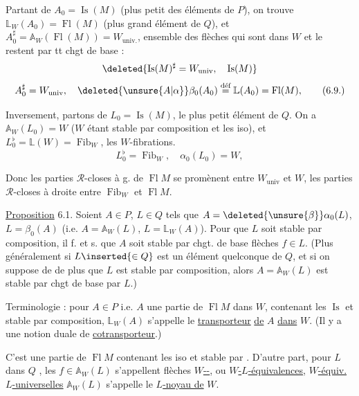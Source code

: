 Partant de $A_0=\operatorname{Is}(M)$ (plus petit des éléments
de $P$), on trouve $\mathbb L_W(A_0)=\operatorname{Fl}(M)$ (plus grand
élément de $Q$), et $A_0^\sharp=\mathbb A_W(\operatorname{Fl}(M))=W_{\mathrm{univ.}}$,
ensemble des flèches qui sont dans $W$ et le
restent par tt chgt de base :
\[
\deleted{\operatorname{Is}(M)^\sharp=W_{\mathrm{univ}},\quad\operatorname{Is}(M)}
\]
\[
A_0^\sharp=W_{\mathrm{univ}},\quad
\deleted{\unsure{A|\alpha}}\beta_0(A_0)\overset{\text{déf}}{=}\mathbb L(A_0)=\operatorname{Fl}(M),
\tag*{(6.9.)}
\]

Inversement, partons de $L_0=\operatorname{Is}(M)$, le plus petit
élément de $Q$. On a $\mathbb A_W(L_0)=W$ ($W$
étant stable par composition et  les iso),
et $L_0^\flat=\mathbb L(W)=\operatorname{Fib}_W$, les $W$-fibrations.
\[
L_0^\flat=\operatorname{Fib}_W,\quad \alpha_0(L_0)=W,
\tag*{(6.10)}
\]

Donc les parties $\mathcal R$-closes à g. de $\operatorname{Fl} M$
se promènent entre $W_{\mathrm{univ}}$ et $W$, les
parties $\mathcal R$-closes à droite entre $\operatorname{Fib}_W$ et $\operatorname{Fl} M$.

\uline{Proposition} 6.1. Soient $A\in P$, $L\in Q$ tels
\llap{\smash{\rule[-4.9\baselineskip]{0.35pt}{5.2\baselineskip}}\hspace{0.5em}}que $A=\deleted{\unsure{\beta}}\alpha_0(L)$, $L=\beta_0(A)$ (i.e. $A=\mathbb A_W(L)$,
$L=\mathbb L_W(A)$). Pour que $L$ soit stable par
composition, il f. et s. que $A$ soit
stable par chgt. de base  
flèches $f\in L$. (Plus généralement si $L\inserted{\in Q}$ est
un élément quelconque de $Q$, et si on suppose de
de plus que  $L$ est stable par composition,
alors $A=\mathbb A_W(L)$ est stable par chgt de base
par $L$.)

Terminologie : pour $A\in P$ i.e. $A$ une
partie de $\operatorname{Fl} M$  dans $W$,
contenant les $\operatorname{Is}$ et stable par composition,
$\mathbb L_W(A)$ s'appelle le \uline{transporteur} \uline{de} $A$ \uline{dans} $W$.
(Il y a une notion duale de \uline{cotransporteur}.)

C'est  une partie de $\operatorname{Fl} M$ contenant les
iso et stable par . D'autre
part, pour $L$ dans $Q$ ,
les $f\in\mathbb A_W(L)$ s'appellent flèches \uline{$W$--},
ou \uline{$W$-$L$-équivalences},  \uline{$W$-équiv. $L$-universelles}
 $\mathbb A_W(L)$ s'appelle le \uline{$L$-noyau de} $W$.

